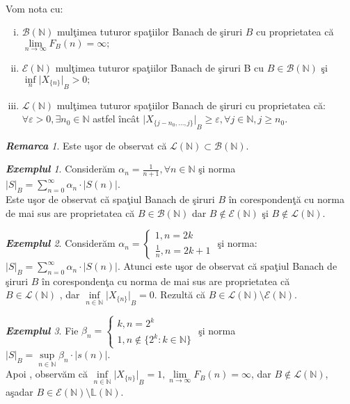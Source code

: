 \documentclass[ a4paper, 12pt]{report}
\theoremstyle{remark}
\newtheorem{remarc}{\bf Remarca}[section]
\newtheorem{exemple}{\bf Exemplul}[section]
\numberwithin{equation}{section}
\begin{document}
\\Vom nota cu:
\begin{enumerate}[(i)]
\item $\mathcal{B}(\mathbb{N})$ mul\c timea tuturor spa\c tiilor Banach de \c siruri $B$ cu proprietatea c\u a $\lim\limits_{n \rightarrow \infty} F_B(n)=\infty;$
\item $\mathcal{E}(\mathbb{N})$ mul\c timea tuturor spa\c tiilor Banach de \c siruri B cu $B \in \mathcal{B}(\mathbb{N})$ \c si $\inf\limits_{n}{\lvert X_{\{n\}} \rvert}_B>0;$
\item $\mathcal{L}(\mathbb{N})$ mul\c timea tuturor spa\c tiilor Banach de \c siruri cu proprietatea c\u a:\\
$\forall \varepsilon>0 , \exists n_0 \in \mathbb{N}$ astfel \^inc\^at ${\lvert X_{\{j-n_0,...,j\}} \rvert}_B \geq \varepsilon , \forall j \in \mathbb{N} , j \geq n_0$.
\end{enumerate}
\begin{remarc}
Este u\c sor de observat c\u a $\mathcal{L}(\mathbb{N})\subset \mathcal{B}(\mathbb{N})$.
\end{remarc}
\begin{exemple}
Consider\u am $\alpha_n=\frac{1}{n+1},\forall n \in \mathbb{N}$ \c si norma \\
${\lvert S \rvert}_B=\sum\limits_{n=0}^{\infty}{\alpha_n \cdot \lvert S(n) \rvert}$.\\
Este u\c sor de observat c\u a spa\c tiul Banach de \c siruri $B$ \^in coresponden\c t\u a cu norma de mai sus are proprietatea c\u a $B \in \mathcal{B}(\mathbb{N})$ dar $B \notin \mathcal{E}(\mathbb{N})$ \c si $B \notin \mathcal{L}(\mathbb{N})$.
\end{exemple}
\begin{exemple}
Consider\u am $\alpha_n=
\begin{cases}
1,n=2k\\
\frac{1}{n},n=2k+1
\end{cases}$ \c si norma:\\
${\lvert S \rvert}_B=\sum\limits_{n=0}^{\infty}{\alpha_n \cdot \lvert S(n) \rvert}$. Atunci este u\c sor de observat c\u a spa\c tiul Banach de \c siruri $B$ \^in coresponden\c ta cu norma de mai sus are proprietatea c\u a \\$B \in \mathcal{L}(\mathbb{N})$ , dar $\inf\limits_{n \in \mathbb{N}}{{\lvert X_{\{n\}} \rvert}_B}=0$. Rezult\u a c\u a $B \in \mathcal{L}(\mathbb{N}) \setminus \mathcal{E}(\mathbb{N})$.
\end{exemple}
\begin{exemple}
Fie $\beta_n=
\begin{cases}
k,n=2^k\\
1,n \notin \{2^k:k \in \mathbb{N}\}
\end{cases}$ \c si norma \\
${\lvert S \rvert}_B=\sup\limits_{n \in \mathbb{N}}{\beta_n \cdot \lvert s(n) \rvert}$.\\
Apoi , observ\u am c\u a $\inf\limits_{n \in \mathbb{N}}{\lvert X_{\{n\}}\rvert}_B=1,\lim\limits_{n \rightarrow \infty} F_B(n)=\infty$, dar $B \notin \mathcal{L}(\mathbb{N})$, a\c sadar $B \in \mathcal{E}(\mathbb{N}) \setminus \mathbb{L}(\mathbb{N})$.
\end{exemple}
\end{document}
